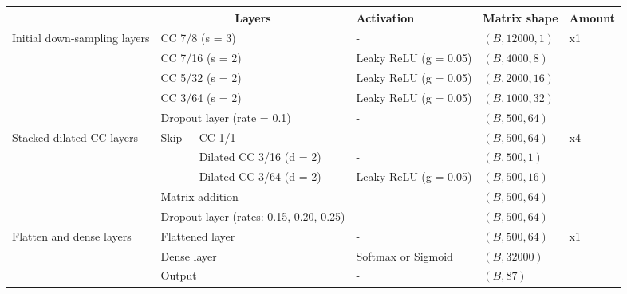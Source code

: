 \documentclass[12pt]{article}
\begin{document}
	\begin{figure}[H]
        \centering
        \begin{scriptsize}
            \begin{tabular}{l|l|l|l|l|l|l|l|l|}
                &\multicolumn{5}{c|}{Layers} & Activation & Matrix shape & Amount\\
                \hline
                \hline
                \multirow{5}{2cm}{Initial down-sampling layers} &\multicolumn{5}{|l|}{CC 7/8 (s = 3)} & - & $(B, 12000, 1)$ &\multirow{5}{*}{x1}\\
                \cline{2-8}
                &\multicolumn{5}{|l|}{CC 7/16 (s = 2)} & Leaky ReLU (g = 0.05) & $(B, 4000, 8)$ &\\
                \cline{2-8}
                &\multicolumn{5}{|l|}{CC 5/32 (s = 2)} & Leaky ReLU (g = 0.05) & $(B, 2000, 16)$ &\\
                \cline{2-8}
                &\multicolumn{5}{|l|}{CC 3/64 (s = 2)} & Leaky ReLU (g = 0.05) & $(B, 1000, 32)$ &\\
                \cline{2-8}
                &\multicolumn{5}{|l|}{Dropout layer (rate = 0.1)} & - & $(B, 500, 64)$ &\\
                \bottomrule
                \multirow{5}{2cm}{Stacked dilated CC layers} &\multirow{3}{*}{Skip} & \multicolumn{4}{l|}{CC 1/1} & - & $(B, 500, 64)$ & \multirow{5}{*}{x4}\\
                \cline{3-8}
                & & \multicolumn{4}{l|}{Dilated CC 3/16 (d = 2)} & - & $(B, 500, 1)$ &\\
                \cline{3-8}
                & &\multicolumn{4}{l|}{Dilated CC 3/64 (d = 2)} & Leaky ReLU (g = 0.05) & $(B, 500, 16)$ &\\
                \cline{2-8}
                & \multicolumn{5}{|l|}{Matrix addition} & - & $(B, 500, 64)$ &\\
                \cline{2-8}
                & \multicolumn{5}{|l|}{Dropout layer (rates: 0.15, 0.20, 0.25)} & - & $(B, 500, 64)$ &\\
                \bottomrule
                \multirow{3}{2cm}{Flatten and dense layers} & \multicolumn{5}{|l|}{Flattened layer} & - & $(B, 500, 64)$ & \multirow{3}{*}{x1}\\
                \cline{2-8}
                & \multicolumn{5}{|l|}{Dense layer}& Softmax or Sigmoid & $(B, 32000)$ &\\
                \cline{2-8}
                & \multicolumn{5}{|l|}{Output} & - & $(B, 87)$ &\\

\end{tabular}
\end{scriptsize}
\end{figure}
\end{document}
